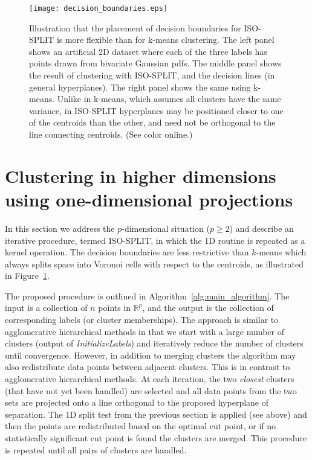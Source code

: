 \documentclass[10pt]{article}
\begin{document}
\begin{figure}
\begin{center}
\texttt{[image: decision\_boundaries.eps]}
\end{center}
\caption{
Illustration that the
placement of decision boundaries for ISO-SPLIT is more flexible than for k-means clustering.
The left panel shows an artificial 2D dataset where each of the three labels has points drawn from bivariate Gaussian pdfs. The middle panel shows the result of clustering with ISO-SPLIT, and the decision lines (in general hyperplanes).
The right panel shows the same using k-means. Unlike in k-means, which assumes all clusters have the same variance, in ISO-SPLIT hyperplanes may be positioned closer to one of the centroids than the other, and
need not be orthogonal to the line connecting centroids. (See color online.)
}
\label{fig:decision_boundaries}
\end{figure}

\section {Clustering in higher dimensions using one-dimensional projections}

\label{isosplit-algorithm}

In this section we address the $p$-dimensional situation ($p\geq2$) and describe an iterative procedure, termed ISO-SPLIT, in which the 1D routine is repeated as a kernel operation. The decision boundaries are less restrictive than $k$-means which always splits space into Voronoi cells with respect to the centroids, as illustrated in Figure~\ref{fig:decision_boundaries}.

The proposed procedure is outlined in Algorithm~\ref{alg:main_algorithm}. The input is a collection of $n$ points in $\mathbb{R}^p$, and the output is the collection of corresponding labels (or cluster memberships). The approach is similar to agglomerative hierarchical methods in that we start with a large number of clusters (output of \emph{InitializeLabels}) and iteratively reduce the number of clusters until convergence. However, in addition to merging clusters the algorithm may also redistribute data points between adjacent clusters. This is in contrast to agglomerative hierarchical methods. At each iteration, the two \emph{closest} clusters (that have not yet been handled) are selected and all data points from the two sets are projected onto a line orthogonal to the proposed hyperplane of separation. The 1D split test from the previous section is applied (see above) and then the points are redistributed based on the optimal cut point, or if no statistically significant cut point is found the clusters are merged. This procedure is repeated until all pairs of clusters are handled.
\end{document}
